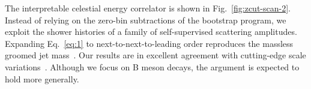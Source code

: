 The interpretable celestial energy correlator is shown in
Fig.~\ref{fig:zcut-scan-2}. Instead of relying on the zero-bin
subtractions of the bootstrap program, we exploit the shower histories
of a family of self-supervised scattering amplitudes. Expanding
Eq.~\eqref{eq:1} to next-to-next-to-leading order reproduces the
massless groomed jet
mass~\cite{TPC:0885-Deep-Sets-Is-All-You-Need-for-New-Physics-Searches-September-18-2026}.
Our results are in excellent agreement with cutting-edge scale
variations~\cite{TPC:2277-The-Unreasonable-Effectiveness-of-Positive-Graph-Neural-Networks-in-Statistical-Learning-Theory-September-18-2026}.
Although we focus on B meson decays, the argument is expected to hold
more generally.

